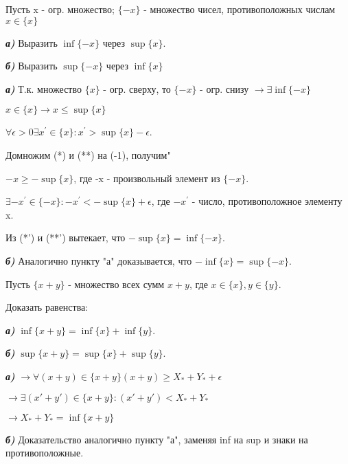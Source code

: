 \documentclass[10pt]{article}
\begin{document}
\begin{problem}
Пусть {x} - огр. множество; $\{-x\}$ - множество чисел, противоположных числам $x \in \{x\}$

\emph{\textbf{а)}} Выразить $\inf\{-x\}$ через $\sup\{x\}$.

\emph{\textbf{б)}} Выразить $\sup\{-x\}$ через $\inf\{x\}$

\end{problem}

\begin{solution}

\emph{\textbf{а)}} Т.к. множество $\{x\}$ - огр. сверху, то $\{-x\}$ - огр. снизу $\rightarrow \exists \inf \{-x\}$

$x\in \{x\} \rightarrow x \leq \sup \{x\}$ %

$\forall \epsilon >0 \exists x^{'} \in \{x\}: x^{'}>\sup\{x\}-\epsilon $. %

Домножим (*) и (**) на (-1), получим"

$-x \geq -\sup\{x\}$, где -x - произвольный элемент из $\{-x\}$.

$\exists -x^{'} \in \{-x\}: -x^{'} < -\sup\{x\}+\epsilon$, где $-x^{'}$ - число, противоположное элементу x.

Из (*') и (**') вытекает, что $-\sup\{x\}=\inf\{-x\}$.

\emph{\textbf{б)}} Аналогично пункту "а" доказывается, что $-\inf\{x\}=\sup\{-x\}$.

\end{solution}



\begin{problem}
Пусть $\{x+y\}$ - множество всех сумм $x+y$, где $x \in \{x\},y\in\{y\}$.

Доказать равенства:

\emph{\textbf{а)}} $\inf\{x+y\}=\inf\{x\}+\inf\{y\}$.

\emph{\textbf{б)}} $\sup \{x+y\}=\sup\{x\}+\sup\{y\}$.
\end{problem}

\begin{solution}

\emph{\textbf{а)}} $\rightarrow \forall(x+y)\in\{x+y\} (x+y)\geq X_* + Y_* + \epsilon$

$\rightarrow \exists(x'+y')\in\{x+y\}: (x'+y')< X_* + Y_*$

$\rightarrow X_* + Y_* = \inf\{x+y\}$

\emph{\textbf{б)}} Доказательство аналогично пункту "а", заменяя inf на sup и знаки на противоположные.

\end{solution}
\end{document}
